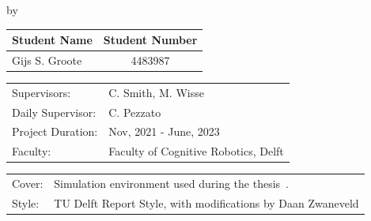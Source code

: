 \begin{titlepage}

\begin{center}

{\makeatletter
\largetitlestyle\fontsize{44}{44}\selectfont\@title
\makeatother}

{\makeatletter
\ifdefvoid{\@subtitle}{}{\bigskip\fontsize{16}{16}\selectfont\@subtitle}
\makeatother}

\bigskip
by
\bigskip

{\makeatletter
\largetitlestyle\fontsize{25}{25}\selectfont\@author
\makeatother}

\bigskip

\setlength\extrarowheight{2pt}
\begin{tabular}{lc}
    Student Name & Student Number \\\midrule
    Gijs S. Groote & 4483987 \\
\end{tabular}

\vfill

\begin{tabular}{ll}
    Supervisors: & C. Smith, M. Wisse \\
    Daily Supervisor: & C. Pezzato \\
    Project Duration: & Nov, 2021 - June, 2023 \\
    Faculty: & Faculty of Cognitive Robotics, Delft
\end{tabular}

\bigskip

\begin{tabular}{p{15mm}p{10cm}}
  Cover: & Simulation environment used during the thesis~\cite{spahn_urdfenvironment_2022}.\\
    Style: & TU Delft Report Style, with modifications by Daan Zwaneveld
\end{tabular}
\end{center}


\end{titlepage}
